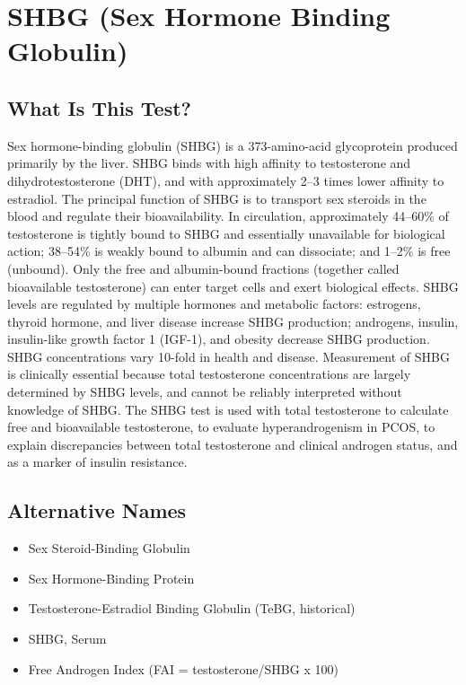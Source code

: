 \chapter{SHBG (Sex Hormone Binding Globulin)}

\section*{What Is This Test?}
Sex hormone-binding globulin (SHBG) is a 373-amino-acid glycoprotein produced primarily by the liver. SHBG binds with high affinity to testosterone and dihydrotestosterone (DHT), and with approximately 2--3 times lower affinity to estradiol. The principal function of SHBG is to transport sex steroids in the blood and regulate their bioavailability. In circulation, approximately 44--60\% of testosterone is tightly bound to SHBG and essentially unavailable for biological action; 38--54\% is weakly bound to albumin and can dissociate; and 1--2\% is free (unbound). Only the free and albumin-bound fractions (together called bioavailable testosterone) can enter target cells and exert biological effects. SHBG levels are regulated by multiple hormones and metabolic factors: estrogens, thyroid hormone, and liver disease increase SHBG production; androgens, insulin, insulin-like growth factor 1 (IGF-1), and obesity decrease SHBG production. SHBG concentrations vary 10-fold in health and disease. Measurement of SHBG is clinically essential because total testosterone concentrations are largely determined by SHBG levels, and cannot be reliably interpreted without knowledge of SHBG. The SHBG test is used with total testosterone to calculate free and bioavailable testosterone, to evaluate hyperandrogenism in PCOS, to explain discrepancies between total testosterone and clinical androgen status, and as a marker of insulin resistance.

\section*{Alternative Names}
\begin{itemize}
  \item Sex Steroid-Binding Globulin
  \item Sex Hormone-Binding Protein
  \item Testosterone-Estradiol Binding Globulin (TeBG, historical)
  \item SHBG, Serum
  \item Free Androgen Index (FAI = testosterone/SHBG x 100)
\end{itemize}
